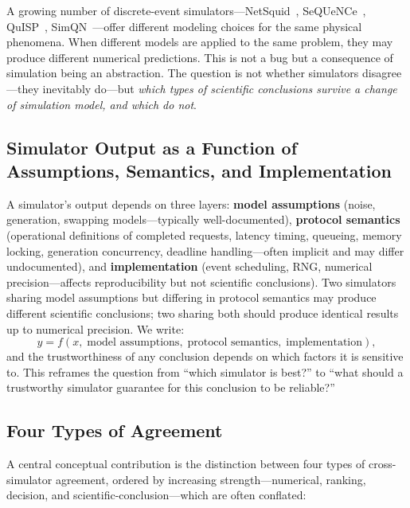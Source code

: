 \documentclass{ams-journal}
\begin{document}
A growing number of discrete-event simulators---NetSquid~\cite{coopmans2021netsquid}, SeQUeNCe~\cite{wu2021sequence}, QuISP~\cite{satoh2022quisp}, SimQN~\cite{chen2023simqn}---offer different modeling choices for the same physical phenomena. When different models are applied to the same problem, they may produce different numerical predictions. This is not a bug but a consequence of simulation being an abstraction. The question is not whether simulators disagree---they inevitably do---but \emph{which types of scientific conclusions survive a change of simulation model, and which do not}.

\subsection{Simulator Output as a Function of Assumptions, Semantics, and Implementation}

A simulator's output depends on three layers: \textbf{model assumptions} (noise, generation, swapping models---typically well-documented), \textbf{protocol semantics} (operational definitions of completed requests, latency timing, queueing, memory locking, generation concurrency, deadline handling---often implicit and may differ undocumented), and \textbf{implementation} (event scheduling, RNG, numerical precision---affects reproducibility but not scientific conclusions). Two simulators sharing model assumptions but differing in protocol semantics may produce different scientific conclusions; two sharing both should produce identical results up to numerical precision. We write:
\begin{equation}
y = f(x,\;\text{model assumptions},\;\text{protocol semantics},\;\text{implementation}),
\end{equation}
and the trustworthiness of any conclusion depends on which factors it is sensitive to. This reframes the question from ``which simulator is best?'' to ``what should a trustworthy simulator guarantee for this conclusion to be reliable?''

\subsection{Four Types of Agreement}
\label{sec:four_agreement}

A central conceptual contribution is the distinction between four types of cross-simulator agreement, ordered by increasing strength---numerical, ranking, decision, and scientific-conclusion---which are often conflated:
\end{document}
